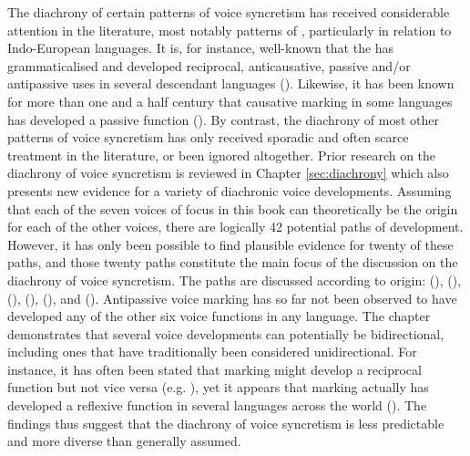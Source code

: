 The diachrony of certain patterns of voice syncretism has received considerable attention in the literature, most notably patterns of , particularly in relation to Indo-European languages. It is, for instance, well-known that the    has grammaticalised and developed reciprocal, anticausative, passive and/or antipassive uses in several descendant languages (). Likewise, it has been known for more than one and a half century that causative marking in some languages has developed a passive function (). By contrast, the diachrony of most other patterns of voice syncretism has only received sporadic and often scarce treatment in the literature, or been ignored altogether. Prior research on the diachrony of voice syncretism is reviewed in Chapter \ref{sec:diachrony} which also presents new evidence for a variety of diachronic voice developments. Assuming that each of the seven voices of focus in this book can theoretically be the origin for each of the other voices, there are logically 42 potential paths of development. However, it has only been possible to find plausible evidence for twenty of these paths, and those twenty paths constitute the main focus of the discussion on the diachrony of voice syncretism. The paths are discussed according to origin:  (),  (),  (),  (),  (), and  (). Antipassive voice marking has so far not been observed to have developed any of the other six voice functions in any language. The chapter demonstrates that several voice developments can potentially be bidirectional, including ones that have traditionally been considered unidirectional. For instance, it has often been stated that  marking might develop a reciprocal function but not vice versa (e.g. \citealt{heine:2000, heine:miyashita:2008}), yet it appears that  marking actually has developed a reflexive function in several languages across the world (). The findings thus suggest that the diachrony of voice syncretism is less predictable and more diverse than generally assumed.

